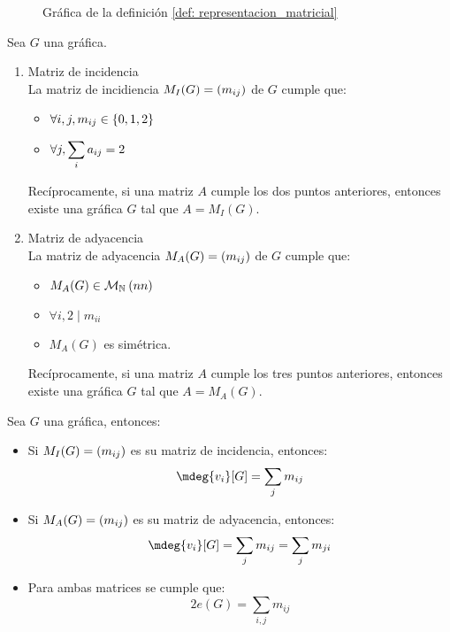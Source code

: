 \begin{figure}[H]
	\centering
	\caption{Gráfica de la definición \ref{def: representacion_matricial}}
	\label{fig: rep_mat}
\end{figure}
\begin{theorem}
	Sea $G$ una gráfica.
	\begin{enumerate}
		\item Matriz de incidencia\\
		La matriz de incidiencia $ M_{I}(G) =\left( m_{ij} \right)$ de $G$ cumple que:
		\begin{itemize}
			\item $\forall i, j, m_{ij}\in\left\{ 0, 1, 2 \right\}$
			\item $\displaystyle\forall j, \sum_{i}a_{ij} = 2$
		\end{itemize}
		Recíprocamente, si una matriz $A$ cumple los dos puntos anteriores, entonces existe una gráfica $G$ tal que $A = M_{I}(G)$.
		\item Matriz de adyacencia\\
		La matriz de adyacencia $ M_{A}(G) =\left( m_{ij} \right)$ de $G$ cumple que:
		\begin{itemize}
			\item $M_{A}(G)\in\mathcal{M}_{\mathbb{N}^{}}\left( nn \right)$
			\item $\forall i, 2\mid m_{ii}$
			\item $M_{A}(G)$ es simétrica.
		\end{itemize}
		Recíprocamente, si una matriz $A$ cumple los tres puntos anteriores, entonces existe una gráfica $G$ tal que $A = M_{A}(G)$.
	\end{enumerate}
\end{theorem}
\begin{theorem}
	Sea $G$ una gráfica, entonces:
	\begin{itemize}
		\item Si $M_{I}(G) =\left( m_{ij} \right)$ es su matriz de incidencia, entonces:
		\[ \mdeg{v_{i}}[G] =\sum_{j}m_{ij} \]
		\item Si $M_{A}(G) =\left( m_{ij} \right)$ es su matriz de adyacencia, entonces:
		\[ \mdeg{v_{i}}[G] =\sum_{j}m_{ij} =\sum_{j}m_{ji} \]
		\item Para ambas matrices se cumple que:
		\[ 2e(G) =\sum_{i, j}m_{ij} \]
	\end{itemize}
\end{theorem}
